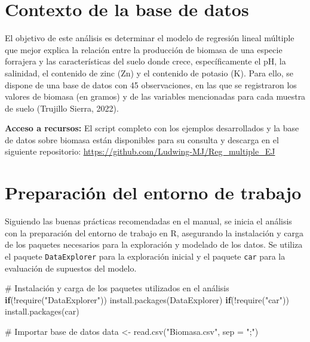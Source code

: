 \documentclass[
  spanish,
  a4paper,
  DIV=11,
  numbers=noendperiod,
  onepage,
  openany]{scrreprt}
\newenvironment{Shaded}{\begin{snugshade}}{\end{snugshade}}
\newcommand{\AttributeTok}[1]{\textcolor[rgb]{0.40,0.45,0.13}{#1}}
\newcommand{\CommentTok}[1]{\textcolor[rgb]{0.37,0.37,0.37}{#1}}
\newcommand{\ControlFlowTok}[1]{\textcolor[rgb]{0.00,0.23,0.31}{\textbf{#1}}}
\newcommand{\FunctionTok}[1]{\textcolor[rgb]{0.28,0.35,0.67}{#1}}
\newcommand{\NormalTok}[1]{\textcolor[rgb]{0.00,0.23,0.31}{#1}}
\newcommand{\OtherTok}[1]{\textcolor[rgb]{0.00,0.23,0.31}{#1}}
\newcommand{\SpecialCharTok}[1]{\textcolor[rgb]{0.37,0.37,0.37}{#1}}
\newcommand{\StringTok}[1]{\textcolor[rgb]{0.13,0.47,0.30}{#1}}
\begin{document}
\section{Contexto de la base de
datos}\label{contexto-de-la-base-de-datos}

El objetivo de este análisis es determinar el modelo de regresión lineal
múltiple que mejor explica la relación entre la producción de biomasa de
una especie forrajera y las características del suelo donde crece,
específicamente el pH, la salinidad, el contenido de zinc (Zn) y el
contenido de potasio (K). Para ello, se dispone de una base de datos con
45 observaciones, en las que se registraron los valores de biomasa (en
gramos) y de las variables mencionadas para cada muestra de suelo
(Trujillo Sierra, 2022).

\textbf{Acceso a recursos:} El script completo con los ejemplos
desarrollados y la base de datos sobre biomasa están disponibles para su
consulta y descarga en el siguiente repositorio:
\url{https://github.com/Ludwing-MJ/Reg_multiple_EJ}

\section{Preparación del entorno de
trabajo}\label{preparaciuxf3n-del-entorno-de-trabajo}

Siguiendo las buenas prácticas recomendadas en el manual, se inicia el
análisis con la preparación del entorno de trabajo en R, asegurando la
instalación y carga de los paquetes necesarios para la exploración y
modelado de los datos. Se utiliza el paquete \texttt{DataExplorer} para
la exploración inicial y el paquete \texttt{car} para la evaluación de
supuestos del modelo.

\begin{Shaded}
\begin{Highlighting}[]
\CommentTok{\# Instalación y carga de los paquetes utilizados en el análisis}
\ControlFlowTok{if}\NormalTok{(}\SpecialCharTok{!}\FunctionTok{require}\NormalTok{(}\StringTok{"DataExplorer"}\NormalTok{)) }\FunctionTok{install.packages}\NormalTok{(DataExplorer)}
\ControlFlowTok{if}\NormalTok{(}\SpecialCharTok{!}\FunctionTok{require}\NormalTok{(}\StringTok{"car"}\NormalTok{)) }\FunctionTok{install.packages}\NormalTok{(car)}

\CommentTok{\# Importar base de datos}
\NormalTok{data }\OtherTok{\textless{}{-}} \FunctionTok{read.csv}\NormalTok{(}\StringTok{"Biomasa.csv"}\NormalTok{, }\AttributeTok{sep =} \StringTok{";"}\NormalTok{)}
\end{Highlighting}
\end{Shaded}
\end{document}
